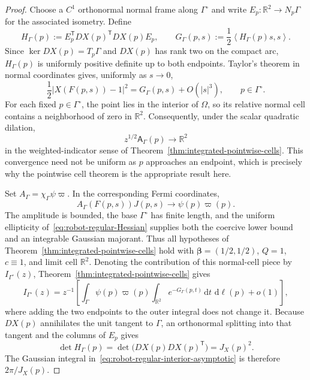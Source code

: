 \documentclass[11pt]{amsart}
\numberwithin{equation}{section}
\theoremstyle{definition}
\theoremstyle{remark}
\newcommand{\R}{\mathbb{R}}
\newcommand{\dd}{\,\mathrm{d}}
\newcommand{\Afib}{\mathsf{A}}
\newcommand{\inner}[2]{\left\langle #1,#2\right\rangle}
\begin{document}
\begin{proof}
Choose a $C^1$ orthonormal normal frame along $\Gamma^\circ$ and write
$E_p:\R^2\to N_p\Gamma$ for the associated isometry.  Define
\begin{equation}\label{eq:robot-regular-Hessian}
 H_\Gamma(p):=E_p^{\mathsf T}DX(p)^{\mathsf T}DX(p)E_p,
 \qquad
 G_\Gamma(p,s):=\frac12\inner{H_\Gamma(p)s}{s}.
\end{equation}
Since $\ker DX(p)=T_p\Gamma$ and $DX(p)$ has rank two on the compact arc,
$H_\Gamma(p)$ is uniformly positive definite up to both endpoints.  Taylor's
theorem in normal coordinates gives, uniformly as $s\to0$,
\begin{equation}\label{eq:robot-regular-normal-model}
 \frac12|X(F(p,s))-1|^2
 =G_\Gamma(p,s)+O(|s|^3),
 \qquad p\in\Gamma^\circ.
\end{equation}
For each fixed $p\in\Gamma^\circ$, the point lies in the interior of $\Omega$,
so its relative normal cell contains a neighborhood of zero in $\R^2$.
Consequently, under the scalar quadratic dilation,
\[
 z^{1/2}\Afib_\Gamma(p)\longrightarrow\R^2
\]
in the weighted-indicator sense of
Theorem~\ref{thm:integrated-pointwise-cells}.  This convergence need not be
uniform as $p$ approaches an endpoint, which is precisely why the pointwise
cell theorem is the appropriate result here.

Set $A_\Gamma=\chi_\Gamma\psi\varpi$.  In the corresponding Fermi
coordinates,
\[
 A_\Gamma(F(p,s))J(p,s)\longrightarrow\psi(p)\varpi(p).
\]
The amplitude is bounded, the base $\Gamma^\circ$ has finite length, and the
uniform ellipticity of~\eqref{eq:robot-regular-Hessian} supplies both the
coercive lower bound and an integrable Gaussian majorant.  Thus all hypotheses
of Theorem~\ref{thm:integrated-pointwise-cells} hold with
$\bm\beta=(1/2,1/2)$, $Q=1$, $c\equiv1$, and limit cell $\R^2$.  Denoting the
contribution of this normal-cell piece by $I_{\Gamma^\circ}(z)$,
Theorem~\ref{thm:integrated-pointwise-cells} gives
\begin{equation}\label{eq:robot-regular-interior-asymptotic}
 I_{\Gamma^\circ}(z)
 =z^{-1}\left[
 \int_{\Gamma}
 \psi(p)\varpi(p)
 \int_{\R^2}e^{-G_\Gamma(p,t)}\dd t\,\dd\ell(p)
 +o(1)\right],
\end{equation}
where adding the two endpoints to the outer integral does not change it.
Because $DX(p)$ annihilates the unit tangent to $\Gamma$, an orthonormal
splitting into that tangent and the columns of $E_p$ gives
\[
 \det H_\Gamma(p)
 =\det\bigl(DX(p)DX(p)^{\mathsf T}\bigr)
 =J_X(p)^2.
\]
The Gaussian integral in~\eqref{eq:robot-regular-interior-asymptotic} is
therefore $2\pi/J_X(p)$.


\end{proof}
\end{document}
